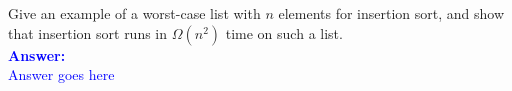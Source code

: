 \item{}
Give an example of a worst-case list with $n$ elements for insertion sort, and
show that insertion sort runs in $\Omega(n^2)$ time on such a list.\\[12pt]
\ifanswers
\textcolor{blue}{
\textbf{Answer:}\\[6pt]
Answer goes here
}
\newpage
\fi

